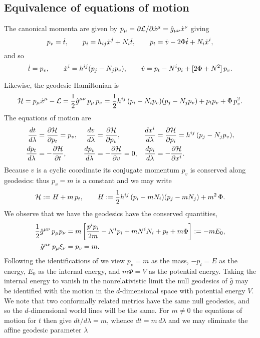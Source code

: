 \documentclass{article}
\begin{document}
\subsection{Equivalence of equations of motion}
The canonical momenta are given by $p_\mu =\partial \mathcal{L}/\partial \dot x\sp{\mu}=\hat{g}_{\mu\nu}\dot{x}^\nu$ giving
$$p_v =\dot t,\qquad p_i=h_{ij} \dot x\sp{j} +N_i \dot t, \qquad p_t=\dot v- 2\Phi \dot t +N_i \dot x\sp{i},
$$
and so
$$\dot t=p_v,\qquad  \dot x\sp{i}=h\sp{ij}(p_j- N_j p_v),\qquad \dot v=p_t-N\sp{i} p_i+[2\Phi +N^2]\, p_v.$$

Likewise, the geodesic Hamiltonian is
$$\mathcal{H}=p_\mu \dot x\sp{\mu}-\mathcal{L} = \frac12 \hat{g}\sp{\mu\nu}\,p_{\mu}\, p_{\nu}=
\frac12 h\sp{ij}\, (p_{i}-N_i p_v)(p_j-N_j p_v) +p_t  p_v+\Phi \,p_v^2 .
$$
The equations of motion are
\begin{align*}
	\frac{dt}{d\lambda}&=\frac{\partial \mathcal{H}}{\partial p_t}=p_v, &
	\frac{dv}{d\lambda}&=\frac{\partial \mathcal{H}}{\partial p_v},& 
	\frac{d x^i}{d\lambda}&=\frac{\partial \mathcal{H}}{\partial p_i}=h\sp{ij}\, (p_j-N_j p_v),
	\\
	\frac{d p_t}{d\lambda}&=-\frac{\partial \mathcal{H}}{\partial t},
	&
	\frac{d p_v}{d\lambda}&=-\frac{\partial \mathcal{H}}{\partial v}=0,&
	\frac{d p_i}{d\lambda}&=-\frac{\partial \mathcal{H}}{\partial x^i}.
\end{align*}
Because $v$ is a cyclic coordinate its conjugate momentum $p_v$ is conserved along geodesics:
thus $p_v=m$ is a constant and we may write
$$\mathcal{H}:=H+m\, p_t,\qquad H:=\frac12 h\sp{ij}\, (p_{i}-m N_i )(p_j-m N_j) +m^2\, \Phi.$$
We observe that we have the geodesics have the conserved quantities,
\begin{align*}
	\frac12 \hat g\sp{\mu\nu}\, p_\mu p_\nu&=m\left[ \frac{p\sp{i}p_i}{2m}- N\sp{i}p_i +m N\sp{i}N_i
	+p_t +m\Phi \right] :=- m E_0,\\
	\hat g\sp{\mu\nu}\, p_\mu \xi_\nu&=p_v=m.
\end{align*}
Following the identifications of \cite{Duval1991} we view $p_v=m$ as the mass, $-p_t=E$  as the energy,
$E_0$ as the internal energy, and $m\Phi=V$ as the potential energy. Taking the internal energy to vanish in the nonrelativistic limit the null geodesics of $\hat g$ may be identified with the motion in the $d$-dimensional space with potential energy $V$. We note that two conformally related metrics have the same null geodesics, and so the $d$-dimensional world lines will be the same. For $m\ne 0$ the equations of motion for $t$ then give $dt/d\lambda=m$, whence $dt =m\,d\lambda$ and we may eliminate the affine geodesic parameter $\lambda$
\end{document}
